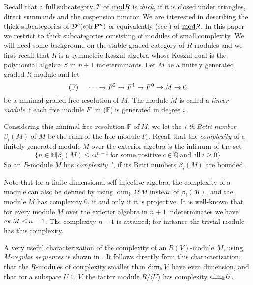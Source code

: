 \documentclass[10pt]{amsart}
\begin{document}
 \noindent Recall that a full subcategory $\mathcal T$ of $\underline{\operatorname{mod}}  R$ 
is {\it thick}, if it is closed under triangles, direct summands and the suspension functor. 
We are interested in describing  the thick subcategories of $\mathcal D^b(\operatorname{coh} {\bf P}^n)$ 
or equivalently (see \cite{BGG}) of $\underline{\operatorname{mod}} R$. In this paper we restrict to
thick subcategories consisting of modules of small complexity.
We will need some 
background on the stable graded category of $R$-modules and we first recall that $R$ is 
a symmetric Koszul algebra whose Koszul dual is the polynomial algebra $S$ in $n+1$ indeterminants.  Let $M$ be 
a finitely generated graded $R$-module and let 
$$(\mathbb{F})\hspace*{0.5cm} \cdots\rightarrow F^2 \rightarrow F^1 \rightarrow F^0 \rightarrow M \rightarrow 0$$
\noindent be a minimal graded free resolution of $M$. The module  $M$ is called a {\em linear module} 
if each free module $F^i$ in ($\mathbb{F}$) is generated in degree $i$.

\noindent  Considering this  minimal free resolution $\mathbb{F}$  of $M$, we let
the {\em i-th Betti number} $\beta_i(M)$ of $M$ be the rank of the free module $F_i$. 
Recall that the {\it complexity} of a finitely generated module $M$ over the exterior algebra 
is the infimum of the set 
$$\{n\in\mathbb N|\beta_i(M)\le ci^{n-1}\ \text{for some positive}  \ c\in\mathbb Q \  \text{and all} \  i\geq 0\}$$ 
\noindent So an $R$-module $M$ has {\it  complexity 1}, if its Betti numbers $\beta_i(M)$ are bounded.

\medskip
\noindent Note that for a finite dimensional self-injective algebra, the complexity of a module can also be
defined by using  $\dim_{\Bbbk} \Omega^iM$ instead of $\beta_i(M)$, and the module $M$
has complexity 0, if and only if it is projective. It is 
well-known that for every module  $M$ over the exterior algebra in $n+1$ indeterminates we have $\operatorname{cx}\nolimits M\le n+1$. 
The complexity $n+1$ is attained; for instance the trivial module has this complexity. 

\medskip
\noindent A very useful characterization of the complexity of an $R(V)$-module
$M$, using {\em M-regular sequences} is shown in \cite[Section 3]{AAH}. It follows directly from this characterization, that the $R$-modules of complexity smaller than $\operatorname{dim}\nolimits_{\Bbbk} V$ have even 
dimension, and that for a subspace $U\subseteq V$, the factor module $R/\langle U \rangle$ has complexity $\operatorname{dim}\nolimits_{\Bbbk} U$.
\end{document}

